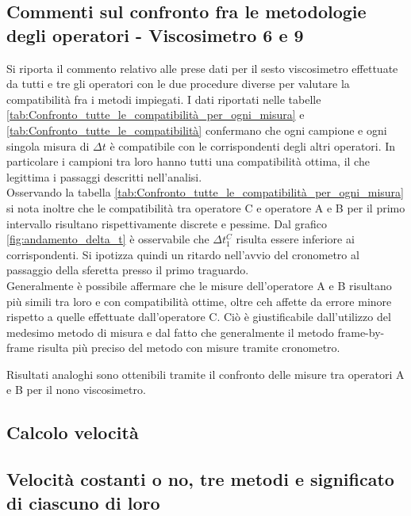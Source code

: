 \documentclass[a4paper,11pt,oneside]{article}
\begin{document}
\subsection*{Commenti sul confronto fra  le metodologie degli operatori - Viscosimetro 6 e 9}
Si riporta il commento relativo alle prese dati per il sesto viscosimetro effettuate da tutti e tre gli operatori con le due procedure diverse per valutare la compatibilità fra i metodi impiegati.
I dati riportati nelle tabelle \ref{tab:Confronto_tutte_le_compatibilità_per_ogni_misura} e  \ref{tab:Confronto_tutte_le_compatibilità} confermano che ogni campione e ogni singola misura di $\Delta t$ è compatibile con le corrispondenti degli altri operatori. In particolare i campioni tra loro hanno tutti una compatibilità ottima, il che legittima i passaggi descritti nell'analisi.\\
Osservando la tabella \ref{tab:Confronto_tutte_le_compatibilità_per_ogni_misura} si nota inoltre che le compatibilità tra operatore C e operatore A e B per il primo intervallo risultano rispettivamente discrete e pessime. Dal grafico \ref{fig:andamento_delta_t} è osservabile che $\Delta t^C_1$ risulta essere inferiore ai corrispondenti. Si ipotizza quindi un ritardo nell'avvio del cronometro al passaggio della sferetta presso il primo traguardo.\\
Generalmente è possibile affermare che le misure dell'operatore A e B risultano più simili tra loro e con compatibilità ottime, oltre ceh affette da errore minore rispetto a quelle effettuate dall'operatore C. Ciò è giustificabile dall'utilizzo del medesimo metodo di misura e dal fatto che generalmente il metodo frame-by-frame risulta più preciso del metodo con misure tramite cronometro.

Risultati analoghi sono ottenibili tramite il confronto delle misure tra operatori A e B per il nono viscosimetro.

\subsection*{Calcolo velocità}

\subsection*{Velocità costanti o no, tre metodi e significato di ciascuno di loro}
\end{document}
